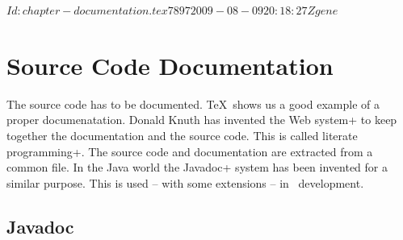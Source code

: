 \SVN$Id: chapter-documentation.tex 7897 2009-08-09 20:18:27Z gene $
\chapter{Source Code Documentation}


The source code has to be documented. \TeX\ shows us a good example of
a proper documenatation. Donald Knuth has invented
the \+Web system+ to keep together the documentation and the source code.
This is called \+literate programming+. The source code and
documentation are extracted from a common file. In the Java world the
\+Javadoc+ system has been invented for a similar purpose. This is
used -- with some extensions -- in \ExTeX\ development.


\section{Javadoc}

